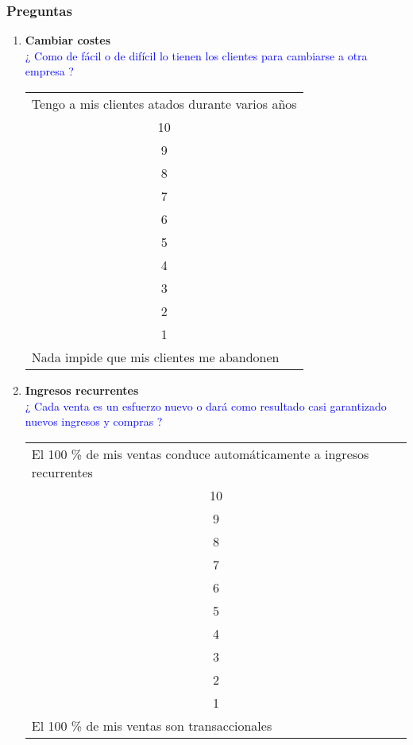 \documentclass[11pt]{book}
\begin{document}
\subsubsection{Preguntas}
\begin{enumerate}
\item \textbf{ Cambiar costes }\\
\textcolor{blue}{ ¿ Como de fácil o de difícil lo tienen los clientes para cambiarse a otra empresa ? }
\begin{table}[htbp]
  \centering

    \begin{tabular}{p{11.855em}}
    Tengo a mis clientes atados durante varios años \\
    \multicolumn{1}{c}{10} \\
    \multicolumn{1}{c}{9} \\
    \multicolumn{1}{c}{8} \\
    \multicolumn{1}{c}{7} \\
    \multicolumn{1}{c}{6} \\
    \multicolumn{1}{c}{5} \\
    \multicolumn{1}{c}{4} \\
    \multicolumn{1}{c}{3} \\
    \multicolumn{1}{c}{2} \\
    \multicolumn{1}{c}{1} \\
    Nada impide que mis clientes me abandonen \\
    \end{tabular}%
  \label{tab:addlabel}%
\end{table}%

\item \textbf{ Ingresos recurrentes }\\
\textcolor{blue}{¿ Cada venta es un esfuerzo nuevo o dará como resultado casi garantizado nuevos ingresos y compras ?}
\begin{table}[htbp]
  \centering

    \begin{tabular}{p{10em}}
    El 100 \% de mis ventas conduce automáticamente a ingresos recurrentes \\
    \multicolumn{1}{c}{10} \\
    \multicolumn{1}{c}{9} \\
    \multicolumn{1}{c}{8} \\
    \multicolumn{1}{c}{7} \\
    \multicolumn{1}{c}{6} \\
    \multicolumn{1}{c}{5} \\
    \multicolumn{1}{c}{4} \\
    \multicolumn{1}{c}{3} \\
    \multicolumn{1}{c}{2} \\
    \multicolumn{1}{c}{1} \\
    El 100 \% de mis ventas son transaccionales \\
    \end{tabular}%
  \label{tab:addlabel}%
\end{table}%


\end{enumerate}
\end{document}
